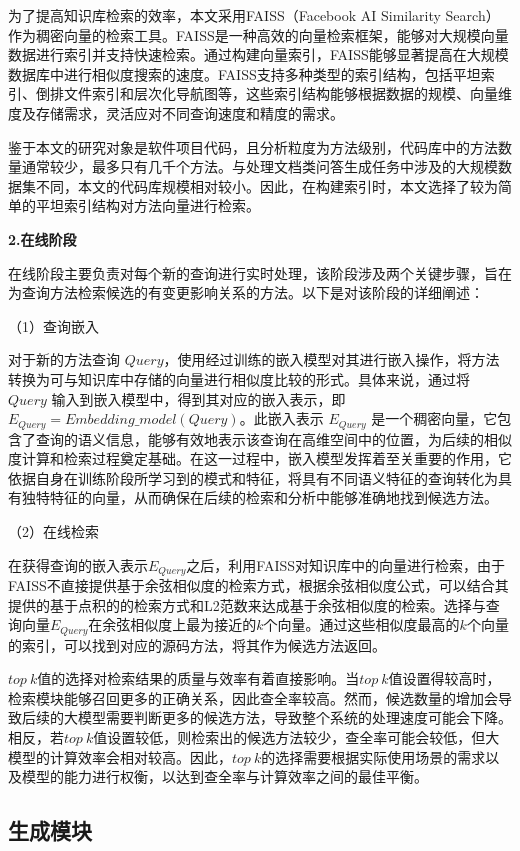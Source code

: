 为了提高知识库检索的效率，本文采用FAISS（Facebook AI Similarity Search）作为稠密向量的检索工具。FAISS是一种高效的向量检索框架，能够对大规模向量数据进行索引并支持快速检索。通过构建向量索引，FAISS能够显著提高在大规模数据库中进行相似度搜索的速度。FAISS支持多种类型的索引结构，包括平坦索引、倒排文件索引和层次化导航图等，这些索引结构能够根据数据的规模、向量维度及存储需求，灵活应对不同查询速度和精度的需求。

鉴于本文的研究对象是软件项目代码，且分析粒度为方法级别，代码库中的方法数量通常较少，最多只有几千个方法。与处理文档类问答生成任务中涉及的大规模数据集不同，本文的代码库规模相对较小。因此，在构建索引时，本文选择了较为简单的平坦索引结构对方法向量进行检索。

\noindent \textbf{2.在线阶段}

在线阶段主要负责对每个新的查询进行实时处理，该阶段涉及两个关键步骤，旨在为查询方法检索候选的有变更影响关系的方法。以下是对该阶段的详细阐述：


（1）查询嵌入

对于新的方法查询 $Query$，使用经过训练的嵌入模型对其进行嵌入操作，将方法转换为可与知识库中存储的向量进行相似度比较的形式。具体来说，通过将 $Query$ 输入到嵌入模型中，得到其对应的嵌入表示，即 $E_{Query}=Embedding\_model(Query)$。此嵌入表示 $E_{Query}$ 是一个稠密向量，它包含了查询的语义信息，能够有效地表示该查询在高维空间中的位置，为后续的相似度计算和检索过程奠定基础。在这一过程中，嵌入模型发挥着至关重要的作用，它依据自身在训练阶段所学习到的模式和特征，将具有不同语义特征的查询转化为具有独特特征的向量，从而确保在后续的检索和分析中能够准确地找到候选方法。


（2）在线检索

在获得查询的嵌入表示$E_{Query}$之后，利用FAISS对知识库中的向量进行检索，由于FAISS不直接提供基于余弦相似度的检索方式，根据余弦相似度公式，可以结合其提供的基于点积的的检索方式和L2范数来达成基于余弦相似度的检索。选择与查询向量$E_{Query}$在余弦相似度上最为接近的$k$个向量。通过这些相似度最高的$k$个向量的索引，可以找到对应的源码方法，将其作为候选方法返回。

$top\ k$值的选择对检索结果的质量与效率有着直接影响。当$top\ k$值设置得较高时，检索模块能够召回更多的正确关系，因此查全率较高。然而，候选数量的增加会导致后续的大模型需要判断更多的候选方法，导致整个系统的处理速度可能会下降。相反，若$top\ k$值设置较低，则检索出的候选方法较少，查全率可能会较低，但大模型的计算效率会相对较高。因此，$top\ k$的选择需要根据实际使用场景的需求以及模型的能力进行权衡，以达到查全率与计算效率之间的最佳平衡。


\subsection{生成模块}

